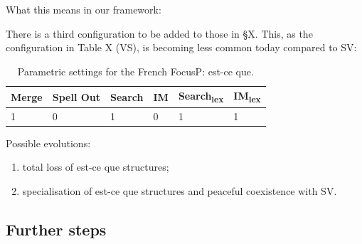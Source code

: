 \documentclass[fleqn,10pt]{wlscirep}
\begin{document}
\noindent What this means in our framework:

\noindent There is a third configuration to be added to those in §X. This, as the configuration in Table X (VS), is becoming less common today compared to SV:

\begin{table}[H]
    \centering
    \begin{tabular}{|l|l|l|l|l|l|}
    \hline
    Merge & Spell Out & Search & IM & Search\textsubscript{lex} & IM\textsubscript{lex} \\
    \hline
    1 & 0 & 1 & 0 & 1 & 1 \\
    \hline
    \end{tabular}
    \caption{\label{tab:samp}Parametric settings for the French FocusP: est-ce que.}
\end{table}

\noindent Possible evolutions:

\begin{enumerate}
    \item \vspace*{-2mm} total loss of est-ce que structures;
    \item \vspace*{-2mm} specialisation of est-ce que structures and peaceful coexistence with SV.
\end{enumerate}

\subsection*{Further steps}
\end{document}
